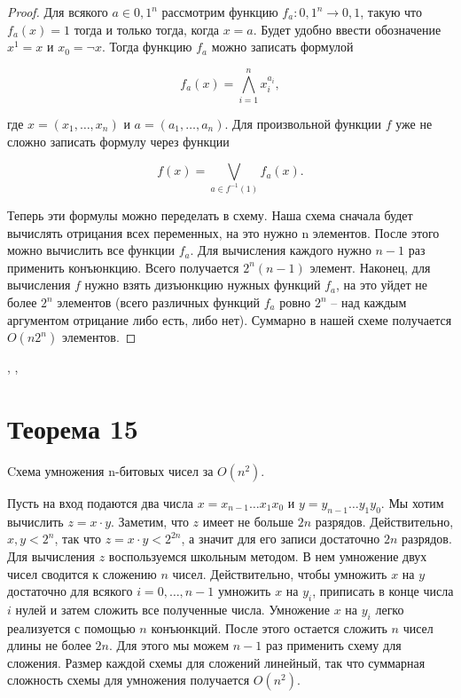\documentclass[a4paper,12pt]{article}
\begin{document}
\begin{proof}
    Для всякого $a \in {0, 1}^n$ рассмотрим функцию $f_a : {0, 1}^n \rightarrow {0, 1}$,
    такую что $f_a(x) = 1$ тогда и только тогда, когда $x = a$. Будет удобно ввести обозначение $x^1 = x$ и $x_0 = \neg x$. Тогда функцию $f_a$ можно записать формулой
    
    $$ f_a(x) = \bigwedge_{i = 1}^{n} x^{a_i}_i,$$
    
    где $x = (x_1, \ldots , x_n)$ и $a = (a_1, \ldots , a_n)$.
    Для произвольной функции $f$ уже не сложно записать формулу через функции
    
    $$ f(x) = \bigvee_{a \in f^{-1}(1)} f_a(x).$$
    
    Теперь эти формулы можно переделать в схему. Наша схема сначала будет вычислять отрицания всех переменных, на это нужно n элементов. После этого можно
    вычислить все функции $f_a$. Для вычисления каждого нужно $n - 1$ раз применить
    конъюнкцию. Всего получается $2^n(n -1)$ элемент. Наконец, для вычисления $f$ нужно взять дизъюнкцию нужных функций $f_a$, на это уйдет не более $2^n$ элементов (всего различных функций $f_a$ ровно $2^n$ -- над каждым аргументом отрицание либо есть, либо нет).
    Суммарно в нашей схеме получается $O(n2^n)$ элементов. 
\end{proof}


\sep
    \sep
    \section{Теорема 15}
    Cхема умножения n-битовых чисел за $O(n^2)$.
    
    Пусть на вход подаются два числа $x=x_{n-1}\ldots x_1x_0$ и
    $y=y_{n-1}\ldots y_1y_0$. Мы хотим вычислить $z = x \cdot y$. Заметим, что
    $z$ имеет не больше $2n$ разрядов. Действительно, $x, y < 2^n$, так что
    $z = x \cdot y < 2^{2n}$, а значит для его записи достаточно $2n$ разрядов.\\
    
    Для вычисления $z$ воспользуемся школьным методом. В нем умножение двух чисел
    сводится к сложению $n$ чисел. Действительно, чтобы умножить $x$ на $y$ достаточно
    для всякого $i = 0, \ldots , n - 1$ умножить $x$ на $y_i$, приписать в конце числа
    $i$ нулей и затем сложить все полученные числа. Умножение $x$ на $y_i$ легко
    реализуется с помощью $n$ конъюнкций. После этого остается сложить $n$ чисел
    длины не более $2n$. Для этого мы можем $n-1$ раз применить схему для сложения.
    Размер каждой схемы для сложений линейный, так что суммарная сложность схемы для
    умножения получается $O(n^2)$.
    
\end{document}
